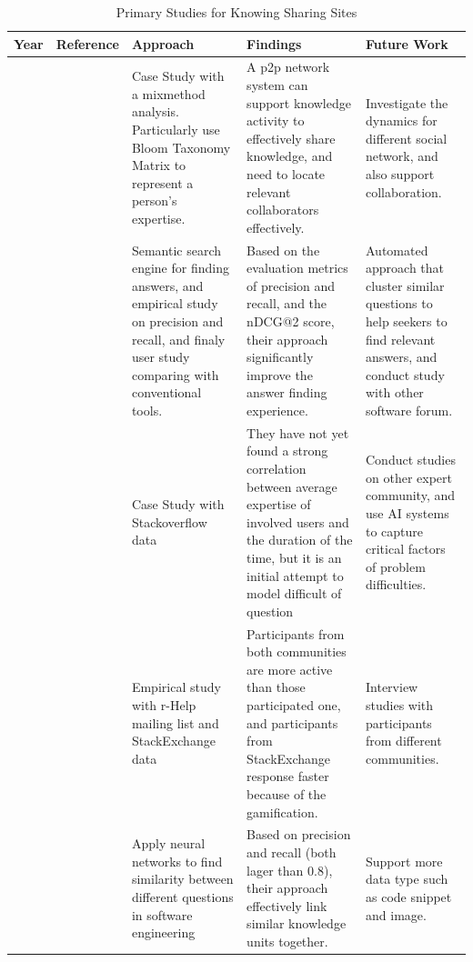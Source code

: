 \begin{table}[htbp]
\centering
\footnotesize
\settowidth{}
\begin{tabulary}{\textwidth}{LLLLL}
\hline
\textbf{Year}           & \textbf{Reference}          & \textbf{Approach}     &\textbf{Findings}  & \textbf{Future Work}\\ \hline
\citeyear{yang2008social} & \citeauthor{yang2008social}\cite{yang2008social} & Case Study with a mixmethod analysis. Particularly use Bloom Taxonomy Matrix to represent a person's expertise. & A p2p network system can support knowledge activity to effectively share knowledge, and need to locate relevant collaborators effectively. & Investigate the dynamics for different social network, and also support collaboration. \\\hline
\citeyear{gottipati2011finding} & \citeauthor{gottipati2011finding}\cite{gottipati2011finding} & Semantic search engine for finding answers, and empirical study on precision and recall, and finaly user study comparing with conventional tools. & Based on the evaluation metrics of precision and recall, and the nDCG@2 score, their approach significantly improve the answer finding experience. & Automated approach that cluster similar questions to help seekers to find relevant answers, and conduct study with other software forum.\\\hline

\citeyear{hanrahan2012modeling} & \citeauthor{hanrahan2012modeling}\cite{hanrahan2012modeling} & Case Study with Stackoverflow data & They have not yet found a strong correlation between average expertise of involved users and the duration of the time, but it is an initial attempt to model difficult of question & Conduct studies on other expert community, and use AI systems to capture critical factors of problem difficulties.\\\hline

\citeyear{vasilescu2014social} & \citeauthor{vasilescu2014social}\cite{vasilescu2014social} & Empirical study with r-Help mailing list and StackExchange data & Participants from both communities are more active than those participated one, and participants from StackExchange response faster because of the gamification. & Interview studies with participants from different communities. \\\hline

\citeyear{xu2016predicting} & \citeauthor{xu2016predicting}\cite{xu2016predicting} & Apply neural networks to find similarity between different questions in software engineering & Based on precision and recall (both lager than 0.8), their approach effectively link similar knowledge units together. & Support more data type such as code snippet and image. \\
 \hline
\end{tabulary}
\caption{Primary Studies for Knowing Sharing Sites}
\label{tab:knowledgeSharing}
\end{table}

